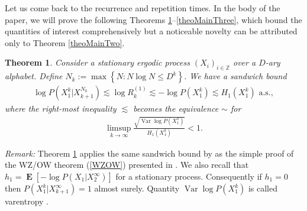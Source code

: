 \documentclass[a4paper,12pt]{article}
\newcommand{\kwad}[1]{\left[ #1 \right]}
\newcommand{\klam}[1]{\left\{ #1 \right\}}
\DeclareMathOperator{\var}{Var}
\DeclareMathOperator{\mean}{\mathbf{E}}
\newtheorem{theorem}{Theorem}
\begin{document}
Let us come back to the recurrence and repetition times.  In the body
of the paper, we will prove the following Theorems
\ref{theoMainOne}--\ref{theoMainThree}, which bound the quantities of
interest comprehensively but a noticeable novelty can be attributed
only to Theorem \ref{theoMainTwo}.
\begin{theorem}
  \label{theoMainOne}
  Consider a stationary ergodic process $(X_i)_{i\in\mathbb{Z}}$ over
  a $D$-ary alphabet. Define $N_k:=\max\klam{N: N\log N\le D^k}$. We
  have a sandwich bound
  \begin{align}
    \log P(X_1^k|X_{k+1}^{N_k})\lesssim
    \log R^{(1)}_k\lesssim
    -\log P(X_1^k)\lesssim
    H_1(X_1^k)
    \text{ a.s.},
  \end{align}
  where the right-most inequality $\lesssim$ becomes the equivalence
  $\sim$ for
  \begin{align}
    \limsup_{k\to\infty} \frac{\sqrt{\var\log P(X_1^k)}}{H_1(X_1^k)}<1.
  \end{align}
\end{theorem}
\emph{Remark:} Theorem \ref{theoMainOne} applies the same sandwich
bound by \citet{Kontoyiannis98} as the simple proof of the WZ/OW
theorem (\ref{WZOW}) presented in \citep[Theorem 9.12]{Debowski21}.
We also recall that $h_1=\mean\kwad{-\log P(X_1|X_2^\infty)}$ for a
stationary process. Consequently if $h_1=0$ then
$P(X_1^k|X_{k+1}^\infty)=1$ almost surely. Quantity
$\var\log P(X_1^k)$ is called varentropy \citep{KontoyiannisVerdu13}.
\end{document}
